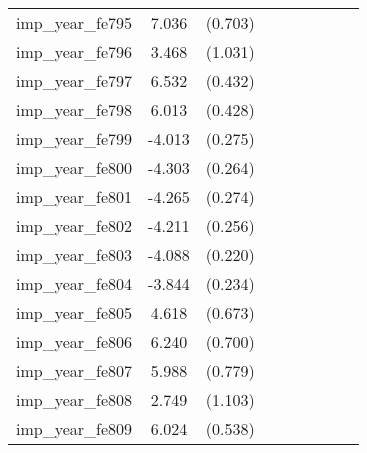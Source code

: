 {\begin{tabular}{l*{4}{cc}}
imp\_year\_fe795&    7.036\sym{***}&  (0.703)&                  &         &                  &         &                  &         \\
imp\_year\_fe796&    3.468\sym{***}&  (1.031)&                  &         &                  &         &                  &         \\
imp\_year\_fe797&    6.532\sym{***}&  (0.432)&                  &         &                  &         &                  &         \\
imp\_year\_fe798&    6.013\sym{***}&  (0.428)&                  &         &                  &         &                  &         \\
imp\_year\_fe799&   -4.013\sym{***}&  (0.275)&                  &         &                  &         &                  &         \\
imp\_year\_fe800&   -4.303\sym{***}&  (0.264)&                  &         &                  &         &                  &         \\
imp\_year\_fe801&   -4.265\sym{***}&  (0.274)&                  &         &                  &         &                  &         \\
imp\_year\_fe802&   -4.211\sym{***}&  (0.256)&                  &         &                  &         &                  &         \\
imp\_year\_fe803&   -4.088\sym{***}&  (0.220)&                  &         &                  &         &                  &         \\
imp\_year\_fe804&   -3.844\sym{***}&  (0.234)&                  &         &                  &         &                  &         \\
imp\_year\_fe805&    4.618\sym{***}&  (0.673)&                  &         &                  &         &                  &         \\
imp\_year\_fe806&    6.240\sym{***}&  (0.700)&                  &         &                  &         &                  &         \\
imp\_year\_fe807&    5.988\sym{***}&  (0.779)&                  &         &                  &         &                  &         \\
imp\_year\_fe808&    2.749\sym{*}  &  (1.103)&                  &         &                  &         &                  &         \\
imp\_year\_fe809&    6.024\sym{***}&  (0.538)&                  &         &                  &         &                  &         \\

\end{tabular}}
